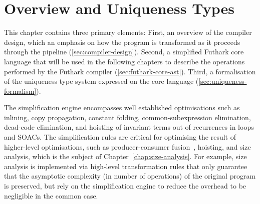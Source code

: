\renewcommand{\sp}{\quad}
\newcommand{\ft}{\phi}
\newcommand{\fts}{\varphi}
\newcommand{\tty}{\rho}
\newcommand{\utty}{\hat{\rho}}
\newcommand{\sembox}[1]{\hfill \normalfont \mbox{\fbox{\(#1\)}}}
\newcommand{\sempart}[2]{\textrm{\textit{#1 \sembox{#2}}}}
\newcommand{\vdb}{\vd_\textrm{b}}
\newcommand{\vde}{\vd_\textrm{e}}
\newcommand{\vdp}{\vd_\textrm{p}}
\newcommand{\vdhp}{\vd_{\hat{\textrm{p}}}}
\newcommand{\vdP}{\vd_\textrm{P}}
\newcommand{\vda}{\vd_\textrm{a}}
\newcommand{\fracc}[2]{\begin{eqnarray} \inference{#1
    }{#2}\end{eqnarray}}
\newcommand{\fraccn}[2]{\refstepcounter{equation}\mbox{$\inference{#1}{#2}$}~(\arabic{equation})}
\newcommand{\fraccc}[2]{\mbox{$\frac{\begin{array}{c} #1 \end{array}}{\begin{array}{c} #2 \end{array}}$}}
\newcommand{\fn}{\ensuremath{\lambda}}
\newcommand{\Fn}[3]{\fn#2:~#1~\rightarrow #3}
\newcommand{\FnU}[2]{\fn#1~\rightarrow #2}
\newcommand{\ubar}[1]{\underline{#1}}
\newcommand{\utau}{\hat{\tau}}
\newcommand{\etau}{\ubar{\tau}}
\newcommand{\opty}{\ubar{\phi}}
\newcommand{\Fun}[4]{\mbox{\lstinline[mathescape]!let\ #1\ #2\ :\ #3 =\ #4!}}

\chapter{Overview and Uniqueness Types}

This chapter contains three primary elements: First, an overview of
the compiler design, which an emphasis on how the program is
transformed as it proceeds through the pipeline
(\cref{sec:compiler-design}).  Second, a simplified Futhark core
language that will be used in the following chapters to describe the
operations performed by the Futhark compiler
(\cref{sec:futhark-core-ast}).  Third, a formalisation of the
uniqueness type system expressed on the core language
(\cref{sec:uniqueness-formalism}).

The simplification engine encompasses well established optimisations
such as inlining, copy propagation, constant folding,
common-subexpression elimination, dead-code elimination, and hoisting
of invariant terms out of recurrences in loops and SOACs.  The
simplification rules are critical for optimising the result of
higher-level optimisations, such as producer-consumer
fusion~\cite{henriksen2014exploiting,henriksen2013t2}, hoisting, and
size analysis, which is the subject of
Chapter~\ref{chap:size-analysis}.  For example, size analysis is
implemented via high-level transformation rules that only guarantee
that the asymptotic complexity (in number of operations) of the
original program is preserved, but rely on the simplification engine
to reduce the overhead to be negligible in the common case.

